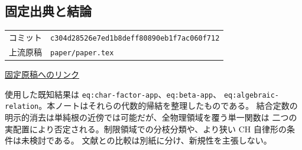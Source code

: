 \documentclass[11pt,a4paper]{article}
\begin{document}
\subsection*{固定出典と結論}
\small
\noindent
\begin{tabular}{@{}ll@{}}
コミット & \texttt{c304d28526e7ed1b8deff80890eb1f7ac060f712}\\
上流原稿 & \texttt{paper/paper.tex}
\end{tabular}\par
\noindent
\href{https://github.com/ryos-physrockme/dbi-stress-tensor-flow/blob/c304d28526e7ed1b8deff80890eb1f7ac060f712/paper/paper.tex}{固定原稿へのリンク}\par
使用した既知結果は \texttt{eq:char-factor-app}、\texttt{eq:beta-app}、
\texttt{eq:algebraic-relation}。本ノートはそれらの代数的帰結を整理したものである。
結合定数の明示的消去は単純根の近傍では可能だが、全物理領域を覆う単一関数は
二つの実配置により否定される。制限領域での分枝分類や、より狭い CH 自律形の条件は未検討である。
文献との比較は別紙に分け、新規性を主張しない。
\end{document}

